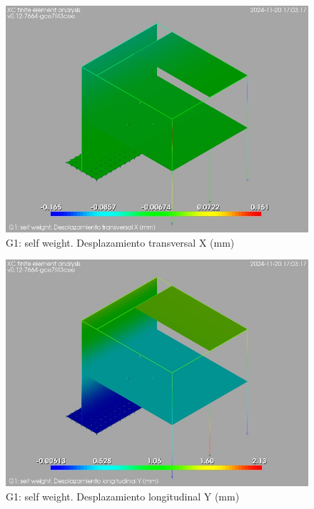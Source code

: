 \begin{figure}[ht]
\begin{center}
\includegraphics[width=\linewidth]{results/graphics/resSimplLC/GselfWeightuX.png}
\caption{ G1: self weight. Desplazamiento transversal X (mm)}
\label{GselfWeightuX}
\end{center}
\end{figure}
\begin{figure}[ht]
\begin{center}
\includegraphics[width=\linewidth]{results/graphics/resSimplLC/GselfWeightuY.png}
\caption{ G1: self weight. Desplazamiento longitudinal Y (mm)}
\label{GselfWeightuY}
\end{center}
\end{figure}
